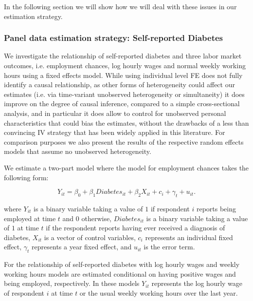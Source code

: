 \documentclass[12pt,english,british]{article}
\begin{document}
In the following section we will show how we will deal with these issues in our estimation strategy.


\subsubsection{Panel data estimation strategy: Self-reported Diabetes}

We investigate the relationship of self-reported diabetes and three
labor market outcomes, i.e. employment chances, log hourly wages
and normal weekly working hours using a fixed effects model. While using individual level \ac{FE} does not fully
identify a causal relationship, as other forms of heterogeneity could
affect our estimates (i.e. via time-variant unobserved heterogeneity
or simultaneity) it does improve on the degree of causal inference,
compared to a simple cross-sectional analysis, and in particular it
does allow to control for unobserved personal characteristics that
could bias the estimates, without the drawbacks of a less than convincing
\ac{IV} strategy that has been widely applied in this literature. 
For comparison purposes we also present the results of the respective random effects models that assume no unobserved heterogeneity.

We estimate a two-part model where the model for employment chances
takes the following form:

\noindent 
\begin{equation}
Y_{it}=\beta_{0}+\beta_{1}Diabetes_{it}+\beta_{2}X_{it}+c_{i}+\gamma_{t}+u_{it}.\label{eq:employed}
\end{equation}


where $Y_{it}$ is a binary variable taking a value of $1$ if respondent
$i$ reports being employed at time $t$ and $0$ otherwise, $Diabetes_{it}$
is a binary variable taking a value of $1$ at time $t$ if the respondent
reports having ever received a diagnosis of diabetes, $X_{it}$ is
a vector of control variables, $c_{i}$ represents an individual fixed
effect, $\gamma_{t}$ represents a year fixed effect, and $u_{it}$
is the error term.

For the relationship of self-reported diabetes with log hourly wages
and weekly working hours models are estimated conditional on having positive wages and being
employed, respectively. In these models $Y_{it}$ represents the log hourly wage
of respondent $i$ at time $t$ or the usual weekly working hours
over the last year.
\end{document}
